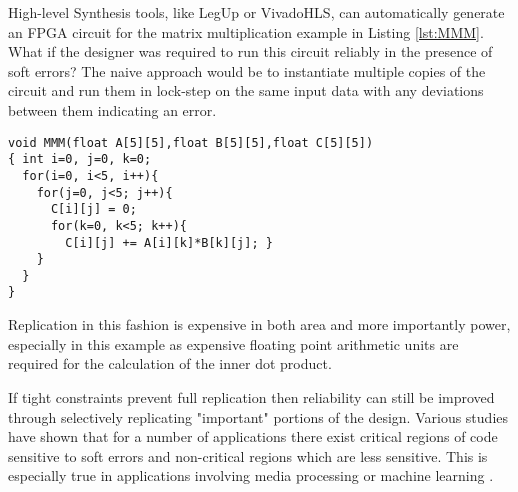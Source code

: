 \providecommand*{\lstnumberautorefname}{line}

High-level Synthesis tools, like LegUp or VivadoHLS, can automatically generate an FPGA 
circuit for the matrix multiplication example in Listing \ref{lst:MMM}.
What if the designer was required to run this circuit reliably in the
presence of soft errors? 
The naive approach would be to instantiate multiple copies of the circuit and run
them in lock-step on the same input data with any deviations between them
indicating an error.

\begin{lstlisting}[label={lst:MMM}, captionpos=b, caption={Matrix Multiplication Example}]
void MMM(float A[5][5],float B[5][5],float C[5][5])
{ int i=0, j=0, k=0;
  for(i=0, i<5, i++){
    for(j=0, j<5; j++){
      C[i][j] = 0;
      for(k=0, k<5; k++){
        C[i][j] += A[i][k]*B[k][j]; }
    }
  }
}
\end{lstlisting}

Replication in this fashion is expensive in both area and more importantly
power, especially in this example as expensive floating point arithmetic
units are required for the calculation of the inner dot product.

If tight constraints prevent full replication then reliability can still be
improved through selectively replicating "important" portions of the design.
Various studies have shown that for a number of applications there exist critical regions
of code sensitive to soft errors and non-critical regions which are less sensitive.
This is especially true in applications involving media processing or machine
learning\cite{wong2006soft} \cite{liu2012flikker}.

